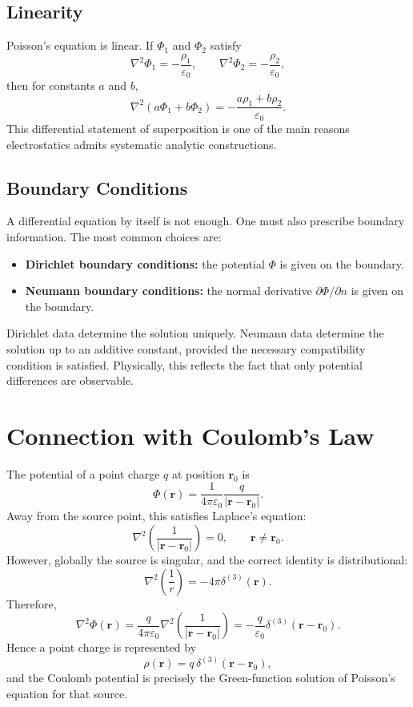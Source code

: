 \documentclass[12pt]{article}
\begin{document}
\subsection{Linearity}
Poisson's equation is linear. If $\Phi_1$ and $\Phi_2$ satisfy
\[
\nabla^2\Phi_1=-\frac{\rho_1}{\varepsilon_0},
\qquad
\nabla^2\Phi_2=-\frac{\rho_2}{\varepsilon_0},
\]
then for constants $a$ and $b$,
\[
\nabla^2(a\Phi_1+b\Phi_2)=-\frac{a\rho_1+b\rho_2}{\varepsilon_0}.
\]
This differential statement of superposition is one of the main reasons electrostatics admits systematic analytic constructions.

\subsection{Boundary Conditions}
A differential equation by itself is not enough. One must also prescribe boundary information. The most common choices are:
\begin{itemize}
\item \textbf{Dirichlet boundary conditions:} the potential $\Phi$ is given on the boundary.
\item \textbf{Neumann boundary conditions:} the normal derivative $\partial \Phi/\partial n$ is given on the boundary.
\end{itemize}
Dirichlet data determine the solution uniquely. Neumann data determine the solution up to an additive constant, provided the necessary compatibility condition is satisfied. Physically, this reflects the fact that only potential differences are observable.

\section{Connection with Coulomb's Law}
The potential of a point charge $q$ at position $\mathbf r_0$ is
\[
\Phi(\mathbf r)=\frac{1}{4\pi\varepsilon_0}\frac{q}{|\mathbf r-\mathbf r_0|}.
\]
Away from the source point, this satisfies Laplace's equation:
\[
\nabla^2\left(\frac{1}{|\mathbf r-\mathbf r_0|}\right)=0,
\qquad
\mathbf r\neq \mathbf r_0.
\]
However, globally the source is singular, and the correct identity is distributional:
\[
\nabla^2\left(\frac{1}{r}\right)=-4\pi\delta^{(3)}(\mathbf r).
\]
Therefore,
\[
\nabla^2\Phi(\mathbf r)
=
\frac{q}{4\pi\varepsilon_0}\nabla^2\left(\frac{1}{|\mathbf r-\mathbf r_0|}\right)
=
-\frac{q}{\varepsilon_0}\delta^{(3)}(\mathbf r-\mathbf r_0).
\]
Hence a point charge is represented by
\[
\rho(\mathbf r)=q\,\delta^{(3)}(\mathbf r-\mathbf r_0),
\]
and the Coulomb potential is precisely the Green-function solution of Poisson's equation for that source.
\end{document}
